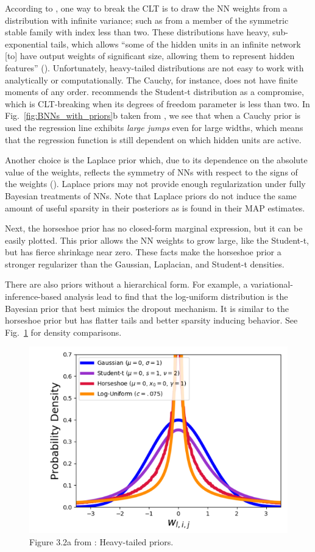 According to \textcite{nalisnick2018priors}, one way to break the CLT is to draw the NN weights from a distribution with infinite variance; such as from a member of the symmetric stable family with index less than two.  
These distributions have heavy, sub-exponential tails, which allows ``some of the hidden units in an infinite network [to] have output weights of significant size, allowing them to represent hidden features'' (\cite{neal1995bayesian}). 
Unfortunately, heavy-tailed distributions are not easy to work with analytically or computationally.  
The Cauchy, for instance, does not have finite moments of any order.  \textcite{neal1995bayesian} recommends the Student-t distribution as a compromise, which is CLT-breaking when its degrees of freedom parameter is less than two. 
In Fig.~\ref{fig:BNNs_with_priors}b taken from \textcite{nalisnick2018priors}, we see that when a Cauchy prior is used the regression line exhibits \textit{large jumps} even for large widths, which means that the regression function is still dependent on which hidden units are active.

Another choice is the Laplace prior which, due to its dependence on the absolute value of the weights, reflects the symmetry of NNs with respect to the signs of the weights (\cite{williams1995bayesian}). 
Laplace priors may not provide enough regularization under fully Bayesian treatments of NNs. 
Note that Laplace priors do not induce the same amount of useful sparsity in their posteriors as is found in their MAP estimates.

Next, the horseshoe prior has no closed-form marginal expression, but it can be easily plotted. 
This prior allows the NN weights to grow large, like the Student-t, but has fierce shrinkage near zero.
These facts make the horseshoe prior a stronger regularizer than the Gaussian, Laplacian, and Student-t densities.

There are also priors without a hierarchical form. 
For example, a variational-inference-based analysis lead \textcite{kingma2015variational} to find that the log-uniform distribution is the Bayesian prior that best mimics the dropout mechanism. 
It is similar to the horseshoe prior but has flatter tails and better sparsity inducing behavior.
See Fig.~\ref{fig:priors} for density comparisons. 

\begin{figure}
	\centering
	\includegraphics[width=0.7\linewidth]{./Figures/priors.png}
	\caption{Figure 3.2a from \textcite{nalisnick2018priors}: Heavy-tailed priors.}
	\label{fig:priors}
\end{figure} 

